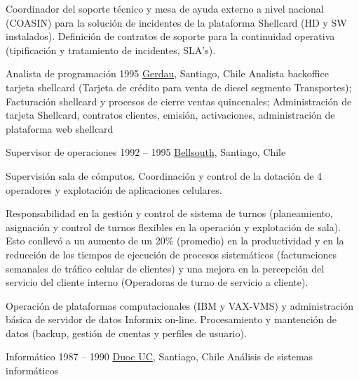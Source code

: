 \begin{joblist}[12.8][8.4][4]
{    \checkmark    Coordinador del soporte técnico y mesa de ayuda externo a nivel nacional (COASIN) para la solución de incidentes de la plataforma Shellcard (HD y SW instalados). Definición de contratos de soporte para la continuidad operativa (tipificación y tratamiento de incidentes, SLA’s).
  }


\item[Analista de programación]{1995}
  {
  \href{https://www.gerdau.cl/}{Gerdau}, Santiago, Chile}
  {
     Analista backoffice tarjeta shellcard (Tarjeta de crédito para venta de diesel segmento Transportes); Facturación shellcard y procesos de cierre ventas quincenales; Administración de tarjeta Shellcard, contratos clientes, emisión, activaciones, administración de plataforma web shellcard
  }


\item[Supervisor de operaciones]{1992 -- 1995}
  {
  \href{https://www.bellsouth.com}{Bellsouth}, Santiago, Chile}
  {
    Supervisión sala de cómputos. Coordinación y control de la dotación de 4 operadores y explotación de aplicaciones celulares.

     \checkmark   Responsabilidad en la gestión y control de sistema de turnos (planeamiento, asignación y control de turnos flexibles en la operación y explotación de sala). Esto conllevó a un aumento de un 20\% (promedio) en la productividad y en la reducción de los tiempos de ejecución de procesos sistemáticos (facturaciones semanales de tráfico celular de clientes) y una mejora en la percepción del servicio del cliente interno (Operadoras de turno de servicio a cliente).

     \checkmark   Operación de plataformas computacionales (IBM y VAX-VMS) y administración básica de servidor de datos Informix on-line. Procesamiento y mantención de datos (backup, gestión de cuentas y perfiles de usuario).
  }


\end{joblist}





\begin{yearlist}[7.7][\tbfborderleft][4]


\item[Informático]{1987 -- 1990}
  { %
  \href{http://www.duoc.cl/}{Duoc UC}, Santiago, Chile
  }
  {   Análisis de sistemas informáticos}

\end{yearlist}



